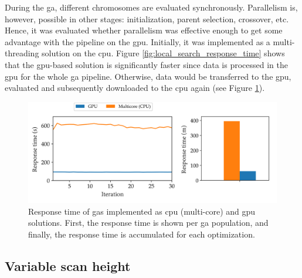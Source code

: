 During the \acrshort{ga}, different chromosomes are evaluated synchronously. Parallelism is, however, possible in other stages: initialization, parent selection, crossover, etc. Hence, it was evaluated whether parallelism was effective enough to get some advantage with the pipeline on the \acrshort{gpu}. Initially, it was implemented as a multi-threading solution on the \acrshort{cpu}. Figure \ref{fig:local_search_response_time} shows that the \acrshort{gpu}-based solution is significantly faster since data is processed in the \acrshort{gpu} for the whole \acrshort{ga} pipeline. Otherwise, data would be transferred to the \acrfull{gpu}, evaluated and subsequently downloaded to the \acrshort{cpu} again (see Figure \ref{fig:ga_response_time}).

\begin{figure}
    \centering
    \includegraphics[width=\linewidth]{figs/lidar_optimization/response_time_results_ga.png}
	\caption{Response time of \acrshort{ga}s implemented as \acrshort{cpu} (multi-core) and \acrshort{gpu} solutions. First, the response time is shown per \acrshort{ga} population, and finally, the response time is accumulated for each optimization.}
	\label{fig:ga_response_time}
\end{figure}

\subsection{Variable scan height}

